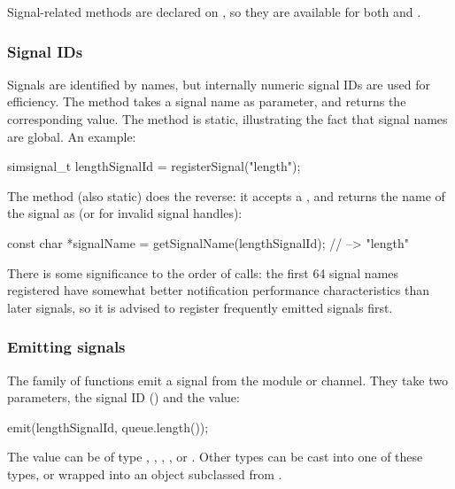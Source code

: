 \begin{note}
\begin{note}
Signal-related methods are declared on , so they are available
for both  and .

\subsubsection{Signal IDs}

Signals are identified by names, but internally numeric signal IDs are used
for efficiency. The  method takes a signal name as
parameter, and returns the corresponding  value.
The method is static, illustrating the fact that signal names are global.
An example:

\begin{cpp}
simsignal_t lengthSignalId = registerSignal("length");
\end{cpp}

The  method (also static) does the reverse:
it accepts a , and returns the name of the signal as
 (or  for invalid signal handles):

\begin{cpp}
const char *signalName = getSignalName(lengthSignalId); // --> "length"
\end{cpp}

\begin{note}
  There is some significance to the order of  calls: the
  first 64 signal names registered have somewhat better notification
  performance characteristics than later signals, so it is advised to
  register frequently emitted signals first.
\end{note}

\subsubsection{Emitting signals}

The  family of functions emit a signal from the module or
channel. They take two parameters, the signal ID () and
the value:

\begin{cpp}
emit(lengthSignalId, queue.length());
\end{cpp}

The value can be of type , , ,
, or . Other types can be cast into
one of these types, or wrapped into an object subclassed from .


\end{note}
\end{note}

